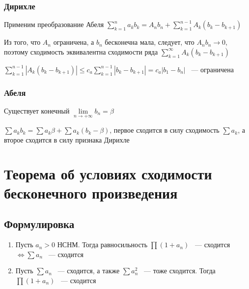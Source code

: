 \documentclass{article}
\begin{document}
            \subsubsection{Дирихле}
            
                Применим преобразование Абеля $\sum\limits^n_{k = 1} a_k b_k = A_n b_n + \sum\limits^{n - 1}_{k = 1} A_k (b_k - b_{k + 1})$
                
                Из того, что $A_n$ ограничена, а $b_n$ бесконечна мала, следует, что $A_n b_n \rightarrow 0$, поэтому сходимость эквивалентна сходимости ряда $\sum\limits^{\infty}_{k = 1} A_k (b_k - b_{k + 1})$
                
                $\sum\limits^{n - 1}_{k = 1} \left| A_k (b_k - b_{k + 1}) \right| \leq c_a \sum\limits^{n - 1}_{k = 1} \left| b_k - b_{k + 1} \right| = c_a |b_1 - b_n|$ ~--- ограничена
                
            \subsubsection{Абеля}
            
                Существует конечный $\lim\limits_{n \rightarrow +\infty} b_n = \beta$
                
                $\sum a_k b_k = \sum a_k \beta + \sum a_k (b_k - \beta)$, первое сходится в силу сходимость $\sum a_k$, а второе сходится в силу признака Дирихле
                
    \newpage
    
    \section{Теорема об условиях сходимости бесконечного произведения}
    
        \subsection{Формулировка}
        
            \begin{enumerate}
            
                \item Пусть $a_n > 0$ НСНМ. Тогда равносильность $\prod\limits (1 + a_n)$ ~--- сходится $\Longleftrightarrow \sum a_n$ ~--- сходится
                
                \item Пусть $\sum a_n$ ~--- сходится, а также $\sum a^2_n$ ~--- тоже сходится. Тогда $\prod (1 + a_n)$ ~--- сходится
                
            \end{enumerate}
        
\end{document}
